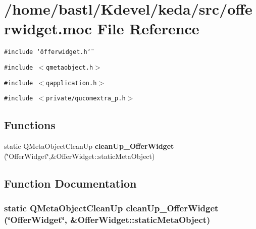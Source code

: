 \section{/home/bastl/Kdevel/keda/src/offerwidget.moc File Reference}
\label{offerwidget_8moc}
{\tt \#include \char`\"{}offerwidget.h\char`\"{}}\par
{\tt \#include $<$qmetaobject.h$>$}\par
{\tt \#include $<$qapplication.h$>$}\par
{\tt \#include $<$private/qucomextra\_\-p.h$>$}\par
\subsection*{Functions}
\begin{CompactItemize}
\item 
static QMeta\-Object\-Clean\-Up {\bf clean\-Up\_\-Offer\-Widget} (\char`\"{}Offer\-Widget\char`\"{},\&Offer\-Widget::static\-Meta\-Object)
\end{CompactItemize}


\subsection{Function Documentation}
\subsubsection{\setlength{\rightskip}{0pt plus 5cm}static QMeta\-Object\-Clean\-Up clean\-Up\_\-Offer\-Widget (\char`\"{}Offer\-Widget\char`\"{}, \&Offer\-Widget::static\-Meta\-Object)\hspace{0.3cm}{\tt  [static]}}\label{offerwidget_8moc_e3a1c6e82697c172d8aedff1edf37dc2}


